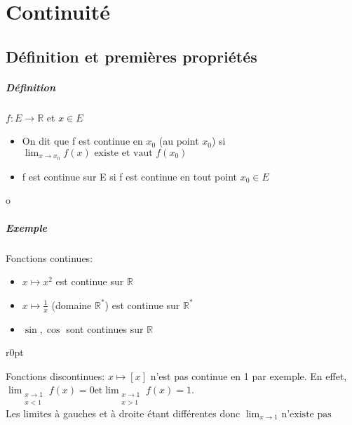\chapter{Continuité}
\section{Définition et premières propriétés}

\paragraph{Définition} $f:E \rightarrow \mathbb{R}$ et $x \in E$ \\
\begin{itemize}
	\item On dit que f est continue en $x_0$ (au point $x_0$) si $\displaystyle \lim_{x\to x_0} f(x) \text{ existe et vaut }f(x_0)$
	\item f est continue sur E si f est continue en tout point $x_0 \in E$
\end{itemize}
o
\paragraph{Exemple} 
Fonctions continues:
\begin{itemize}
	\item $x \mapsto x^2$ est continue sur $\mathbb{R}$
	\item $x \mapsto \frac{1}{x}$ (domaine $\mathbb{R}^*$) est continue sur $\mathbb{R}^*$
	\item $\sin, \cos$ sont continues sur $\mathbb{R}$
\end{itemize}

\begin{wrapfigure}{r}{0pt}
\end{wrapfigure}
Fonctions discontinues:
$x \mapsto [x]$ n'est pas continue en 1 par exemple. En effet, $\displaystyle \lim_{\substack{x\to 1 \\ x<1}} f(x) = 0 \text{et} \lim_{\substack{x\to 1 \\  x>1}} f(x) = 1$.~\\
Les limites à gauches et à droite étant différentes donc $\lim_{x\to 1} \text{ n'existe pas }$


